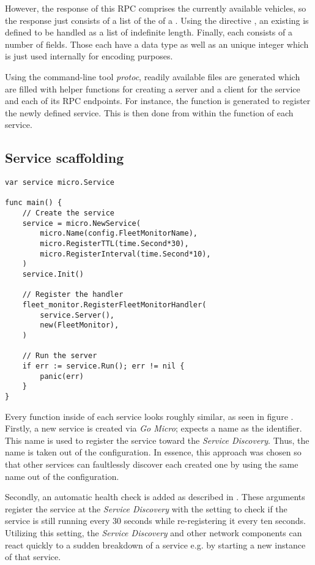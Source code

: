 \documentclass[12pt,a4paper,twoside]{report}
\begin{document}
However, the response of this RPC comprises the currently available vehicles,
so the response just consists of a list of the  of a .
Using the directive , an existing  is defined to be
handled as a list of indefinite length.
Finally, each  consists of a number of fields. Those each have
a data type as well as an unique integer which is just used internally for
encoding purposes.

Using the command-line tool \textit{protoc}, readily available  files
are generated which are filled with helper functions for creating
a server and a client for the service and each of its RPC endpoints.
For instance, the function  is generated
to register the newly defined service.
This is then done from within the  function of each service.

\subsection{Service scaffolding}

\begin{lstlisting}[title=services/fleet-monitor/main.go, float, floatplacement=H]
var service micro.Service

func main() {
	// Create the service
	service = micro.NewService(
		micro.Name(config.FleetMonitorName),
		micro.RegisterTTL(time.Second*30),
		micro.RegisterInterval(time.Second*10),
	)
	service.Init()

    // Register the handler
	fleet_monitor.RegisterFleetMonitorHandler(
		service.Server(),
		new(FleetMonitor),
	)

    // Run the server
	if err := service.Run(); err != nil {
		panic(err)
	}
}
\end{lstlisting}

Every  function inside of each service looks roughly similar,
as seen in figure .
Firstly, a new service is created via \textit{Go Micro};
 expects a name as the identifier.
This name is used to register the service toward the \textit{Service Discovery}.
Thus, the name is taken out of the configuration.
In essence, this approach was chosen so that other services can
faultlessly discover each created one by using the same name out of the configuration.

Secondly, an automatic health check is added as described in
. These arguments register the service
at the \textit{Service Discovery} with the setting to check if the service is
still running every 30 seconds while re-registering it every ten seconds.
Utilizing this setting, the \textit{Service Discovery} and other
network components can react quickly to a sudden breakdown of a service e.g.
by starting a new instance of that service.
\end{document}
